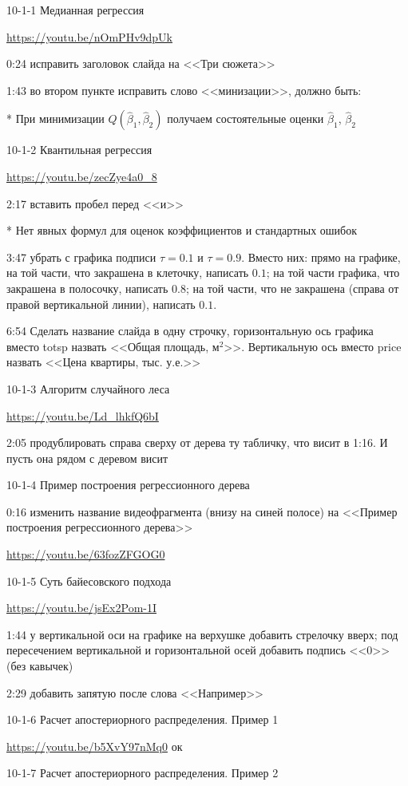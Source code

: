 \documentclass[12pt,a4paper]{article}
\renewcommand{\b}{\beta}
\newcommand{\hb}{\hat{\b}}
\begin{document}
10-1-1 Медианная регрессия

\url{https://youtu.be/nOmPHv9dpUk}

0:24 исправить заголовок слайда на <<Три сюжета>>

1:43 во втором пункте исправить слово <<минизации>>, должно быть:

* При минимизации $Q(\hb_1,\hb_2)$ получаем состоятельные оценки $\hb_1$, $\hb_2$


10-1-2 Квантильная регрессия

\url{https://youtu.be/zecZye4a0_8}

2:17 вставить пробел перед <<и>>

* Нет явных формул для оценок коэффициентов и стандартных ошибок

3:47 убрать с графика подписи $\tau=0.1$ и $\tau=0.9$. Вместо них: прямо на графике, на той части, что закрашена в клеточку, написать $0.1$; на той части графика, что закрашена в полосочку, написать $0.8$; на той части, что не закрашена (справа от правой вертикальной линии), написать $0.1$. 

6:54 Сделать название слайда в одну строчку, горизонтальную ось графика вместо totsp назвать <<Общая площадь, м$^2$>>. Вертикальную ось вместо price назвать <<Цена квартиры, тыс. у.е.>>


10-1-3 Алгоритм случайного леса

\url{https://youtu.be/Ld_lhkfQ6bI}

2:05 продублировать справа сверху от дерева ту табличку, что висит в 1:16. И пусть она рядом с деревом висит

10-1-4 Пример построения регрессионного дерева

0:16 изменить название видеофрагмента (внизу на синей полосе) на <<Пример построения регрессионного дерева>>

\url{https://youtu.be/63fozZFGOG0}

10-1-5 Суть байесовского подхода

\url{https://youtu.be/jsEx2Pom-1I}

1:44 у вертикальной оси на графике на верхушке добавить стрелочку вверх; под пересечением вертикальной и горизонтальной осей добавить подпись <<0>> (без кавычек)

2:29 добавить запятую после слова <<Например>>

10-1-6 Расчет апостериорного распределения. Пример 1

\url{https://youtu.be/b5XvY97nMq0} ок

10-1-7 Расчет апостериорного распределения. Пример 2
\end{document}
